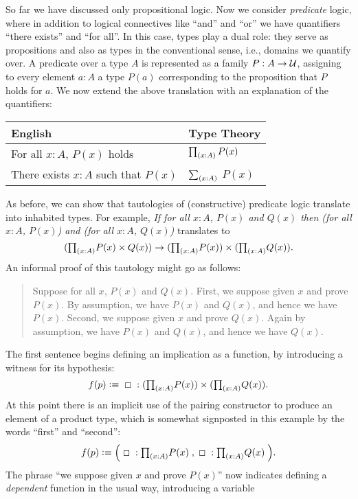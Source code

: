 \mentalpause

So far we have discussed only propositional logic.
%
%
%
%
%
Now we consider \emph{predicate} logic, where in addition to logical connectives like ``and'' and ``or'' we have quantifiers ``there exists'' and ``for all''.
In this case, types play a dual role: they serve as propositions and also as types in the conventional sense, i.e., domains we quantify over.
A predicate over a type $A$ is represented as a family $P : A \to \mathcal{U}$, assigning to every element $a : A$ a type $P(a)$ corresponding to the proposition that $P$ holds for $a$. We now extend the above translation with an explanation of the quantifiers:
\begin{center}
  \medskip
  \begin{tabular}{ll}
    \toprule
    English & Type Theory\\
    \midrule
    For all $x:A$, $P(x)$ holds & $\prd{x:A} P(x)$ \\
    There exists $x:A$ such that $P(x)$ & $\sm{x:A}$ $P(x)$ \\
    \bottomrule
  \end{tabular}
  \medskip
\end{center}
As before, we can show that tautologies of (constructive) predicate logic translate into inhabited types.
For example, \emph{If for all $x:A$, $P(x)$ and $Q(x)$ then (for all $x:A$, $P(x)$) and (for all $x:A$, $Q(x)$)} translates to
\[ (\tprd{x:A} P(x) \times Q(x)) \to (\tprd{x:A} P(x)) \times (\tprd{x:A} Q(x)). \]
An informal proof of this tautology might go as follows:
\begin{quote}
  Suppose for all $x$, $P(x)$ and $Q(x)$.
  First, we suppose given $x$ and prove $P(x)$.
  By assumption, we have $P(x)$ and $Q(x)$, and hence we have $P(x)$.
  Second, we suppose given $x$ and prove $Q(x)$.
  Again by assumption, we have $P(x)$ and $Q(x)$, and hence we have $Q(x)$.
\end{quote}
The first sentence begins defining an implication as a function, by introducing a witness for its hypothesis:
\[ f(p) \defeq \;\Box\; : (\tprd{x:A} P(x)) \times (\tprd{x:A} Q(x)). \]
At this point there is an implicit use of the pairing constructor to produce an element of a product type, which is somewhat signposted in this example by the words ``first'' and ``second'':
\[ f(p) \defeq \Big( \;\Box\; : \tprd{x:A} P(x) \;,\; \Box\; : \tprd{x:A}Q(x) \;\Big). \]
The phrase ``we suppose given $x$ and prove $P(x)$'' now indicates defining a \emph{dependent} function in the usual way, introducing a variable
